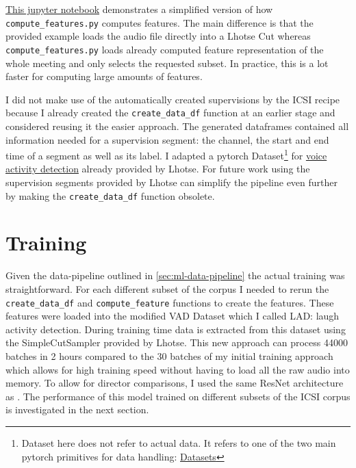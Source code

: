 \documentclass[bsc,frontabs,parskip,deptreport]{infthesis}
\begin{document}
\href{https://github.com/LasseWolter/laughter-detection-icsi/blob/main/Demo.ipynb}{This jupyter notebook} demonstrates a simplified version of how \verb|compute_features.py| computes features. 
The main difference is that the provided example loads the audio file directly into a Lhotse Cut whereas \verb|compute_features.py| loads already computed feature representation of the whole meeting and only selects the requested subset. In practice, this is a lot faster for computing large amounts of features.

I did not make use of the automatically created supervisions by the ICSI recipe because I already created the \verb|create_data_df| function at an earlier stage and considered reusing it the easier approach.
The generated dataframes contained all information needed for a supervision segment: the channel, the start and end time of a segment as well as its label. 
I adapted a pytorch Dataset\footnote{Dataset here does not refer to actual data. It refers to one of the two main pytorch primitives for data handling: \href{https://pytorch.org/tutorials/beginner/basics/data_tutorial.html}{Datasets}} for \href{https://lhotse.readthedocs.io/en/latest/datasets.html#lhotse.dataset.vad.VadDataset}{voice activity detection} already provided by Lhotse.
For future work using the supervision segments provided by Lhotse can simplify the pipeline even further by making the \verb|create_data_df| function obsolete. 

\section{Training}
Given the data-pipeline outlined in \autoref{sec:ml-data-pipeline} the actual training was straightforward. For each different subset of the corpus I needed to rerun the \verb|create_data_df| and \verb|compute_feature| functions to create the features. 
These features were loaded into the modified VAD Dataset which I called LAD: laugh activity detection.
During training time data is extracted from this dataset using the SimpleCutSampler provided by Lhotse. 
This new approach can process 44000 batches in 2 hours compared to the 30 batches of my initial training approach which allows for high training speed without having to load all the raw audio into memory.
To allow for director comparisons, I used the same ResNet architecture as \citeauthor{gillick2021robust}.
The performance of this model trained on different subsets of the ICSI corpus is investigated in the next section.
\end{document}

